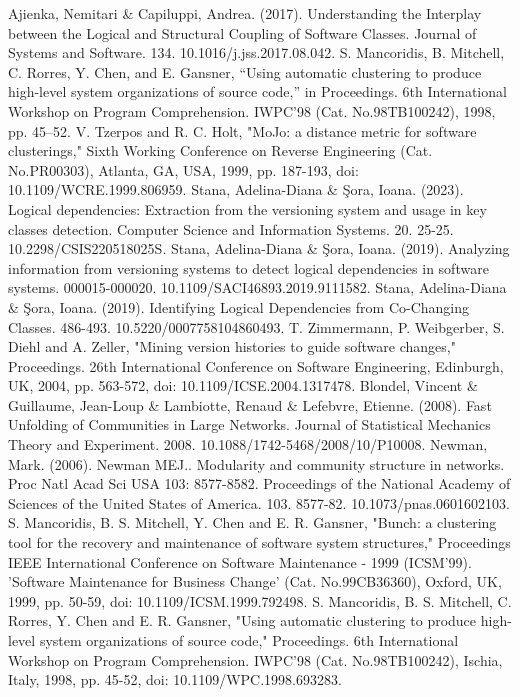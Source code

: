\documentclass{ieeeaccess}
\begin{document}
\begin{thebibliography}{00}

 Ajienka, Nemitari \& Capiluppi, Andrea. (2017). Understanding the Interplay between the Logical and Structural Coupling of Software Classes. Journal of Systems and Software. 134. 10.1016/j.jss.2017.08.042.
 S. Mancoridis, B. Mitchell, C. Rorres, Y. Chen, and E. Gansner, “Using automatic clustering to produce high-level system organizations of source code,” in Proceedings. 6th International Workshop on Program Comprehension. IWPC’98 (Cat. No.98TB100242), 1998, pp. 45–52.
 V. Tzerpos and R. C. Holt, "MoJo: a distance metric for software clusterings," Sixth Working Conference on Reverse Engineering (Cat. No.PR00303), Atlanta, GA, USA, 1999, pp. 187-193, doi: 10.1109/WCRE.1999.806959.
 Stana, Adelina-Diana \& Şora, Ioana. (2023). Logical dependencies: Extraction from the versioning system and usage in key classes detection. Computer Science and Information Systems. 20. 25-25. 10.2298/CSIS220518025S. 
 Stana, Adelina-Diana \& Şora, Ioana. (2019). Analyzing information from versioning systems to detect logical dependencies in software systems. 000015-000020. 10.1109/SACI46893.2019.9111582. 
 Stana, Adelina-Diana \& Şora, Ioana. (2019). Identifying Logical Dependencies from Co-Changing Classes. 486-493. 10.5220/0007758104860493. 
 T. Zimmermann, P. Weibgerber, S. Diehl and A. Zeller, "Mining version histories to guide software changes," Proceedings. 26th International Conference on Software Engineering, Edinburgh, UK, 2004, pp. 563-572, doi: 10.1109/ICSE.2004.1317478.
 Blondel, Vincent \& Guillaume, Jean-Loup \& Lambiotte, Renaud \& Lefebvre, Etienne. (2008). Fast Unfolding of Communities in Large Networks. Journal of Statistical Mechanics Theory and Experiment. 2008. 10.1088/1742-5468/2008/10/P10008. 
 Newman, Mark. (2006). Newman MEJ.. Modularity and community structure in networks. Proc Natl Acad Sci USA 103: 8577-8582. Proceedings of the National Academy of Sciences of the United States of America. 103. 8577-82. 10.1073/pnas.0601602103. 
 S. Mancoridis, B. S. Mitchell, Y. Chen and E. R. Gansner, "Bunch: a clustering tool for the recovery and maintenance of software system structures," Proceedings IEEE International Conference on Software Maintenance - 1999 (ICSM'99). 'Software Maintenance for Business Change' (Cat. No.99CB36360), Oxford, UK, 1999, pp. 50-59, doi: 10.1109/ICSM.1999.792498.
 S. Mancoridis, B. S. Mitchell, C. Rorres, Y. Chen and E. R. Gansner, "Using automatic clustering to produce high-level system organizations of source code," Proceedings. 6th International Workshop on Program Comprehension. IWPC'98 (Cat. No.98TB100242), Ischia, Italy, 1998, pp. 45-52, doi: 10.1109/WPC.1998.693283.

\end{thebibliography}
\end{document}
